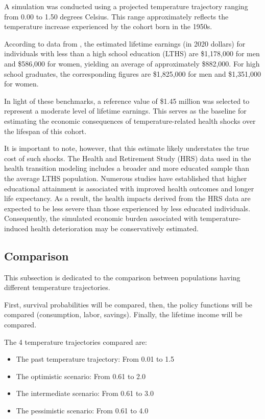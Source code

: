 \documentclass{article}
\begin{document}
A simulation was conducted using a projected temperature trajectory ranging from 0.00 to 1.50 degrees Celsius. This range approximately reflects the temperature increase experienced by the cohort born in the 1950s.

According to data from \cite{Lifetime_income}, the estimated lifetime earnings (in 2020 dollars) for individuals with less than a high school education (LTHS) are \$1,178,000 for men and \$586,000 for women, yielding an average of approximately \$882,000.
For high school graduates, the corresponding figures are \$1,825,000 for men and \$1,351,000 for women.

In light of these benchmarks, a reference value of \$1.45 million was selected to represent a moderate level of lifetime earnings. This serves as the baseline for estimating the economic consequences of temperature-related health shocks over the lifespan of this cohort.

It is important to note, however, that this estimate likely understates the true cost of such shocks. The Health and Retirement Study (HRS) data used in the health transition modeling includes a broader and more educated sample than the average LTHS population. Numerous studies have established that higher educational attainment is associated with improved health outcomes and longer life expectancy. As a result, the health impacts derived from the HRS data are expected to be less severe than those experienced by less educated individuals. Consequently, the simulated economic burden associated with temperature-induced health deterioration may be conservatively estimated.

\subsection{Comparison}

This subsection is dedicated to the comparison between 
populations having different temperature trajectories. 

First, survival probabilities will be compared, 
then, the policy functions will be compared (consumption, labor, savings). 
Finally, the lifetime income will be compared.

The 4 temperature trajectories compared are: 

\begin{itemize}
    \item The past temperature trajectory: From 0.01 to 1.5
    \item The optimistic scenario: From 0.61 to 2.0
    \item The intermediate scenario: From 0.61 to 3.0 
    \item The pessimistic scenario: From 0.61 to 4.0 
\end{itemize}
\end{document}
